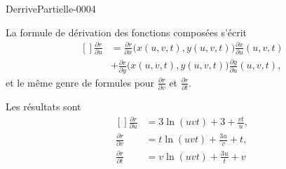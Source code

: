 
\begin{corrige}{DerrivePartielle-0004}

	La formule de dérivation des fonctions composées s'écrit
	\begin{equation}
		\begin{aligned}[]
			\frac{ \partial r }{ \partial u }&=\frac{ \partial r }{ \partial x }\big( x(u,v,t),y(u,v,t) \big)\frac{ \partial x }{ \partial u }(u,v,t)\\
			&+\frac{ \partial r }{ \partial y }\big( x(u,v,t),y(u,v,t) \big)\frac{ \partial y }{ \partial u }(u,v,t),
		\end{aligned}
	\end{equation}
	et le même genre de formules pour $\frac{ \partial r }{ \partial v }$ et $\frac{ \partial r }{ \partial t }$.

	Les résultats sont
	\begin{equation}
		\begin{aligned}[]
			\frac{ \partial r }{ \partial u }&=3\ln(uvt)+3+\frac{ vt }{ u },\\
			\frac{ \partial r }{ \partial v }&=t\ln(uvt)+\frac{ 3u }{ v }+t,\\
			\frac{ \partial r }{ \partial t }&=v\ln(uvt)+\frac{ 3u }{ t }+v
		\end{aligned}
	\end{equation}

\end{corrige}
